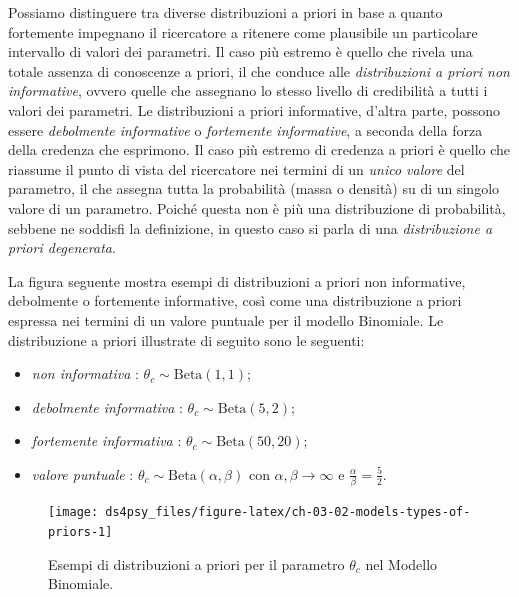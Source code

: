 \documentclass[
  11pt,
]{krantz}
\providecommand{\tightlist}{%
  \setlength{\itemsep}{0pt}\setlength{\parskip}{0pt}}
\theoremstyle{definition}
\theoremstyle{definition}
\theoremstyle{definition}
\theoremstyle{definition}
\theoremstyle{remark}
\begin{document}
Possiamo distinguere tra diverse distribuzioni a priori in base a quanto fortemente impegnano il ricercatore a ritenere come plausibile un particolare intervallo di valori dei parametri. Il caso più estremo è quello che rivela una totale assenza di conoscenze a priori, il che conduce alle \emph{distribuzioni a priori non informative}, ovvero quelle che assegnano lo stesso livello di credibilità a tutti i valori dei parametri. Le distribuzioni a priori informative, d'altra parte, possono essere \emph{debolmente informative} o \emph{fortemente informative}, a seconda della forza della credenza che esprimono. Il caso più estremo di credenza a priori è quello che riassume il punto di vista del ricercatore nei termini di un \emph{unico valore} del parametro, il che assegna tutta la probabilità (massa o densità) su di un singolo valore di un parametro. Poiché questa non è più una distribuzione di probabilità, sebbene ne soddisfi la definizione, in questo caso si parla di una \emph{distribuzione a priori degenerata}.

La figura seguente mostra esempi di distribuzioni a priori non informative, debolmente o fortemente informative, così come una distribuzione a priori espressa nei termini di un valore puntuale per il modello Binomiale. Le distribuzione a priori illustrate di seguito sono le seguenti:

\begin{itemize}
\tightlist
\item
  \emph{non informativa} : \(\theta_c \sim \mbox{Beta}(1,1)\);
\item
  \emph{debolmente informativa} : \(\theta_c \sim \mbox{Beta}(5,2)\);
\item
  \emph{fortemente informativa} : \(\theta_c \sim \mbox{Beta}(50,20)\);
\item
  \emph{valore puntuale} : \(\theta_c \sim \mbox{Beta}(\alpha, \beta)\) con \(\alpha, \beta \rightarrow \infty\) e \(\frac{\alpha}{\beta} = \frac{5}{2}\).
\end{itemize}

\begin{figure}[h]

{\centering \texttt{[image: ds4psy\_files/figure-latex/ch-03-02-models-types-of-priors-1]} 

}

\caption{Esempi di distribuzioni a priori per il parametro $\theta_c$ nel Modello Binomiale.}\label{fig:ch-03-02-models-types-of-priors}
\end{figure}
\end{document}
